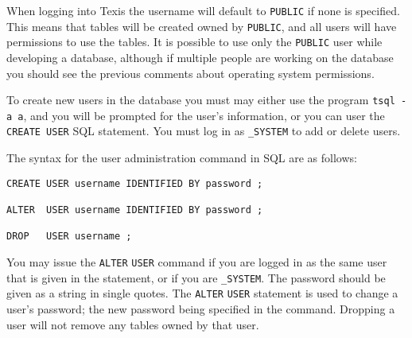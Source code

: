 When logging into Texis the username will default to {\tt PUBLIC} if
none is specified.  This means that tables will be created
owned by {\tt PUBLIC}, and all users will have permissions to use
the tables.  It is possible to use only the {\tt PUBLIC} user while
developing a database, although if multiple people are working
on the database you should see the previous comments about
operating system permissions.

To create new users in the database you must may either use the
program {\tt tsql -a a}, and you will be prompted for the user's
information, or you can user the {\tt CREATE USER} SQL statement.
You must log in as {\tt \_SYSTEM} to add or delete users.

The syntax for the user administration command in SQL are as follows:

\begin{verbatim}
CREATE USER username IDENTIFIED BY password ;

ALTER  USER username IDENTIFIED BY password ;

DROP   USER username ;
\end{verbatim}

You may issue the \verb`ALTER` \verb`USER` command if you are logged
in as the same user that is given in the statement, or if you are
{\tt \_SYSTEM}.  The password should be given as a string in single
quotes.  The \verb`ALTER` \verb`USER` statement is used to change a
user's password; the new password being specified in the command.
Dropping a user will not remove any tables owned by that user.

%
%
%

